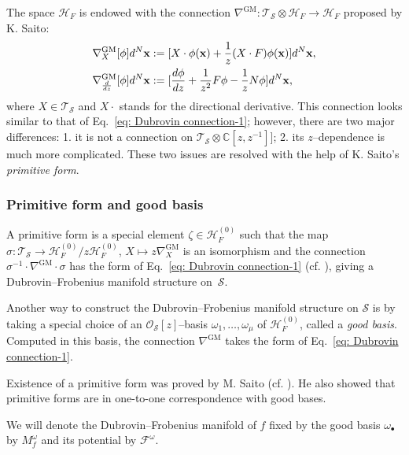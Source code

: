 \documentclass[12pt,a4paper]{amsart}
\newcommand{\CC}{{\mathbb{C}}}
\newcommand{\calS}{{\cal S}}
\newcommand{\F}[2]{{F_{#1}^{#2}}}
\newcommand{\bx}{{\bf x}}
\def\F{{\mathcal F}}
\def\H{{\mathcal H}}
\def\O{{\mathcal O}}
\def\T{{\mathcal T}}
\renewcommand{\S}{{\mathcal S}}
\def\calS{{\mathcal S}}
\newcommand{\<}{\left<}
\renewcommand{\>}{\right>}
\newcommand{\GM}{{\mathrm{GM}}}
\numberwithin{equation}{section}
\begin{document}
The space $\H_F$ is endowed with the connection $\nabla^\GM: \T_\calS \otimes \H_F \to \H_F $ proposed by K. Saito:
\begin{align*}
    & \nabla^\GM_{X} [\phi]d^N\bx := [X \cdot \phi(\bx) + \frac{1}{z} (X \cdot F)\phi(\bx)]d^N\bx,
    \\
    & \nabla^\GM_{\frac{d}{dz}} [\phi]d^N\bx := [\frac{d\phi}{dz} + \frac{1}{z^2} F \phi - \frac{1}{z} N \phi ]d^N\bx,
\end{align*}
where $X \in \T_\calS$ and $X\cdot$ stands for the directional derivative.
This connection looks similar to that of Eq.~\eqref{eq: Dubrovin connection-1}; however, there are two major differences: 1. it is not a connection on $\T_\calS\otimes \CC[z,z^{-1}]]$; 2. its $z$--dependence is much more complicated. These two issues are resolved with the help of K. Saito's \textit{primitive form}.

\subsubsection{Primitive form and good basis}
A primitive form is a special element $\zeta \in \H_F^{(0)}$ such that the map $\sigma: \T_\calS \to \H_F^{(0)} / z \H_F^{(0)}$, $X \mapsto z \nabla^\GM_X$ is an isomorphism and the connection $\sigma^{-1} \cdot \nabla^\GM \cdot \sigma$ has the form of Eq.~\eqref{eq: Dubrovin connection-1} (cf. \cite{SK2,ST}), giving a Dubrovin--Frobenius manifold structure on~$\calS$.

Another way to construct the Dubrovin--Frobenius manifold structure on $\S$ is by taking a special choice of an $\O_\S[z]$--basis $\omega_1,\dots,\omega_\mu$ of $\H_F^{(0)}$, called a \textit{good basis}. Computed in this basis, the connection $\nabla^\GM$ takes the form of Eq.~\eqref{eq: Dubrovin connection-1}.

Existence of a primitive form was proved by M. Saito (cf. \cite{SM1,SM2}). He also showed that primitive forms are in one-to-one correspondence with good bases.

We will denote the Dubrovin--Frobenius manifold of $f$ fixed by the good basis $\omega_\bullet$ by $M_f^\omega$ and its potential by $\F^\omega$.

\end{document}
